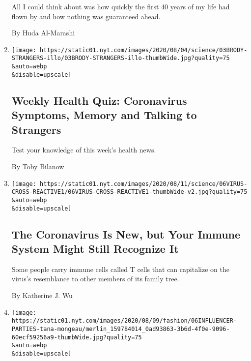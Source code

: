 \begin{enumerate}
  All I could think about was how quickly the first 40 years of my life
  had flown by and how nothing was guaranteed ahead.

  By Huda Al-Marashi
\item
  \href{/interactive/2020/08/07/well/live/07healthquiz-08072020.html}{}

  \texttt{[image: https://static01.nyt.com/images/2020/08/04/science/03BRODY-STRANGERS-illo/03BRODY-STRANGERS-illo-thumbWide.jpg?quality=75\\\&auto=webp\\\&disable=upscale]}

  \hypertarget{weekly-health-quiz-coronavirus-symptoms-memory-and-talking-to-strangers-1}{%
  \subsection{Weekly Health Quiz: Coronavirus Symptoms, Memory and
  Talking to
  Strangers}\label{weekly-health-quiz-coronavirus-symptoms-memory-and-talking-to-strangers-1}}

  Test your knowledge of this week's health news.

  By Toby Bilanow
\item
  \href{/2020/08/06/health/coronavirus-immune-cells.html}{}

  \texttt{[image: https://static01.nyt.com/images/2020/08/11/science/06VIRUS-CROSS-REACTIVE1/06VIRUS-CROSS-REACTIVE1-thumbWide-v2.jpg?quality=75\\\&auto=webp\\\&disable=upscale]}

  \hypertarget{the-coronavirus-is-new-but-your-immune-system-might-still-recognize-it}{%
  \subsection{The Coronavirus Is New, but Your Immune System Might Still
  Recognize
  It}\label{the-coronavirus-is-new-but-your-immune-system-might-still-recognize-it}}

  Some people carry immune cells called T cells that can capitalize on
  the virus's resemblance to other members of its family tree.

  By Katherine J. Wu
\item
  \href{/2020/08/06/style/influencer-parties-jake-paul-tana-mongeau-thomas-petrou-hype-house.html}{}

  \texttt{[image: https://static01.nyt.com/images/2020/08/09/fashion/06INFLUENCER-PARTIES-tana-mongeau/merlin\_159784014\_0ad93863-3b6d-4f0e-9096-60ecf59256a9-thumbWide.jpg?quality=75\\\&auto=webp\\\&disable=upscale]}

  \hypertarget{why-influencers-wont-stop-partying-anytime-soon}{%
}
\end{enumerate}
